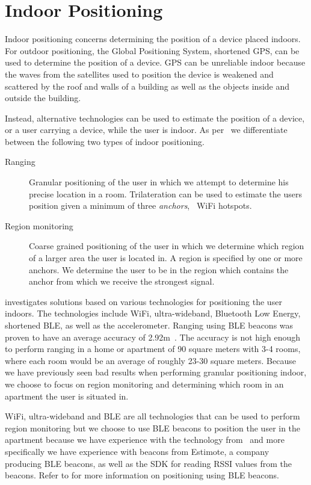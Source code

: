 \section{Indoor Positioning}
\label{sec:analysis:indoor-positioning}

Indoor positioning concerns determining the position of a device placed indoors. For outdoor positioning, the Global Positioning System, shortened GPS, can be used to determine the position of a device. GPS can be unreliable indoor because the waves from the satellites used to position the device is weakened and scattered by the roof and walls of a building as well as the objects inside and outside the building.

Instead, alternative technologies can be used to estimate the position of a device, or a user carrying a device, while the user is indoor. As per~\cite{prespecialisation} we differentiate between the following two types of indoor positioning.

\begin{description}
\item[Ranging] Granular positioning of the user in which we attempt to determine his precise location in a room. Trilateration can be used to estimate the users position given a minimum of three \emph{anchors}, \eg~WiFi hotspots.
\item[Region monitoring] Coarse grained positioning of the user in which we determine which region of a larger area the user is located in. A region is specified by one or more anchors. We determine the user to be in the region which contains the anchor from which we receive the strongest signal.
\end{description}

\cite{prespecialisation} investigates solutions based on various technologies for positioning the user indoors. The technologies include WiFi, ultra-wideband, Bluetooth Low Energy, shortened BLE, as well as the accelerometer. Ranging using BLE beacons was proven to have an average accuracy of 2.92m~\cite[p. 63]{prespecialisation}. The accuracy is not high enough to perform ranging in a home or apartment of 90 square meters with 3-4 rooms, where each room would be an average of roughly 23-30 square meters. Because we have previously seen bad results when performing granular positioning indoor, we choose to focus on region monitoring and determining which room in an apartment the user is situated in.

WiFi, ultra-wideband and BLE are all technologies that can be used to perform region monitoring but we choose to use BLE beacons to position the user in the apartment because we have experience with the technology from~\cite{prespecialisation} and more specifically we have experience with beacons from Estimote, a company producing BLE beacons, as well as the SDK for reading RSSI values from the beacons. Refer to  for more information on positioning using BLE beacons.

